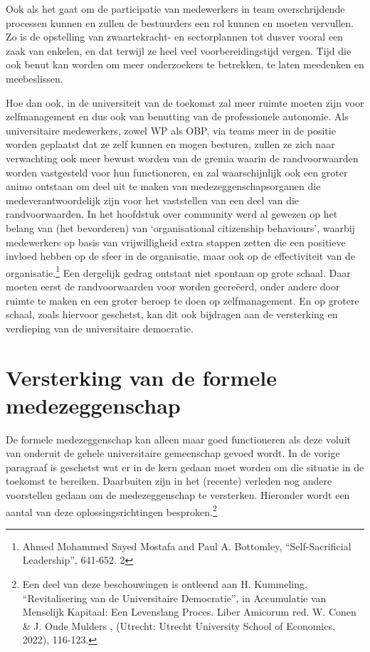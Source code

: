 \documentclass[empirical, authordate, ]{new-jote-article}
\begin{document}
	Ook als het gaat om de participatie van medewerkers in team overschrijdende processen kunnen en zullen de bestuurders een rol kunnen en moeten vervullen. Zo is de opstelling van zwaartekracht- en sectorplannen tot dusver vooral een zaak van enkelen, en dat terwijl ze heel veel voorbereidingstijd vergen. Tijd die ook benut kan worden om meer onderzoekers te betrekken, te laten meedenken en meebeslissen.



	Hoe dan ook, in de universiteit van de toekomst zal meer ruimte moeten zijn voor zelfmanagement en dus ook van benutting van de professionele autonomie. Als universitaire medewerkers, zowel WP als OBP, via teams meer in de positie worden geplaatst dat ze zelf kunnen en mogen besturen, zullen ze zich naar verwachting ook meer bewust worden van de gremia waarin de randvoorwaarden worden vastgesteld voor hun functioneren, en zal waarschijnlijk ook een groter animo ontstaan om deel uit te maken van medezeggenschapsorganen die medeverantwoordelijk zijn voor het vaststellen van een deel van die randvoorwaarden. In het hoofdstuk over community werd al gewezen op het belang van (het bevorderen) van ‘organisational citizenship behaviours', waarbij medewerkers op basis van vrijwilligheid extra stappen zetten die een positieve invloed hebben op de sfeer in de organisatie, maar ook op de effectiviteit van de organisatie.\footnote{Ahmed Mohammed Sayed Mostafa and Paul A. Bottomley, “Self-Sacrificial Leadership”, 641-652. 2} Een dergelijk gedrag ontstaat niet spontaan op grote schaal. Daar moeten eerst de randvoorwaarden voor worden gecreëerd, onder andere door ruimte te maken en een groter beroep te doen op zelfmanagement. En op grotere schaal, zoals hiervoor geschetst, kan dit ook bijdragen aan de versterking en verdieping van de universitaire democratie.



	\section{Versterking van de formele medezeggenschap}



	De formele medezeggenschap kan alleen maar goed functioneren als deze voluit van onderuit de gehele universitaire gemeenschap gevoed wordt. In de vorige paragraaf is geschetst wat er in de kern gedaan moet worden om die situatie in de toekomst te bereiken. Daarbuiten zijn in het (recente) verleden nog andere voorstellen gedaan om de medezeggenschap te versterken. Hieronder wordt een aantal van deze oplossingsrichtingen besproken.\footnote{Een deel van deze beschouwingen is ontleend aan H. Kummeling, “Revitalisering van de Universitaire Democratie”, in Accumulatie van Menselijk Kapitaal: Een Levenslang Proces. Liber Amicorum red. W. Conen \& J. Oude Mulders , (Utrecht: Utrecht University School of Economics, 2022), 116-123.}
\end{document}

